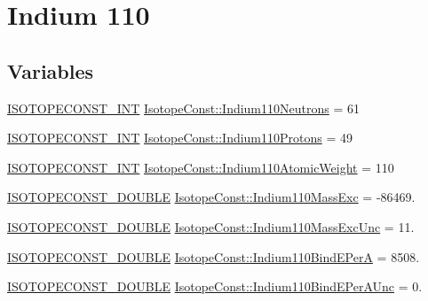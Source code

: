 \hypertarget{group___isotope_const-_indium-_in110}{}\section{Indium 110}
\label{group___isotope_const-_indium-_in110}
\subsection*{Variables}
\begin{DoxyCompactItemize}
\item 
\mbox{\hyperlink{group___isotope_const-_macros_ga5f18360b3e99483a35c32d789e62621c}{I\+S\+O\+T\+O\+P\+E\+C\+O\+N\+S\+T\+\_\+\+I\+NT}} \mbox{\hyperlink{group___isotope_const-_indium-_in110_gab02e4994dcbec53f0df51ac422ecd6f7}{Isotope\+Const\+::\+Indium110\+Neutrons}} = 61
\item 
\mbox{\hyperlink{group___isotope_const-_macros_ga5f18360b3e99483a35c32d789e62621c}{I\+S\+O\+T\+O\+P\+E\+C\+O\+N\+S\+T\+\_\+\+I\+NT}} \mbox{\hyperlink{group___isotope_const-_indium-_in110_ga3eb5f874d2904cc25ff4b0c7fe9475ab}{Isotope\+Const\+::\+Indium110\+Protons}} = 49
\item 
\mbox{\hyperlink{group___isotope_const-_macros_ga5f18360b3e99483a35c32d789e62621c}{I\+S\+O\+T\+O\+P\+E\+C\+O\+N\+S\+T\+\_\+\+I\+NT}} \mbox{\hyperlink{group___isotope_const-_indium-_in110_gabcf9bf4e6c944aa9c7cfcc2087b8ff17}{Isotope\+Const\+::\+Indium110\+Atomic\+Weight}} = 110
\item 
\mbox{\hyperlink{group___isotope_const-_macros_ga8f45a7272ce02c0b4c65c44636ed719a}{I\+S\+O\+T\+O\+P\+E\+C\+O\+N\+S\+T\+\_\+\+D\+O\+U\+B\+LE}} \mbox{\hyperlink{group___isotope_const-_indium-_in110_gafb3084ef3de1ffc30f1478830eda8339}{Isotope\+Const\+::\+Indium110\+Mass\+Exc}} = -\/86469.
\item 
\mbox{\hyperlink{group___isotope_const-_macros_ga8f45a7272ce02c0b4c65c44636ed719a}{I\+S\+O\+T\+O\+P\+E\+C\+O\+N\+S\+T\+\_\+\+D\+O\+U\+B\+LE}} \mbox{\hyperlink{group___isotope_const-_indium-_in110_ga13f943dd42b8c1345153fc0c58b29a2c}{Isotope\+Const\+::\+Indium110\+Mass\+Exc\+Unc}} = 11.
\item 
\mbox{\hyperlink{group___isotope_const-_macros_ga8f45a7272ce02c0b4c65c44636ed719a}{I\+S\+O\+T\+O\+P\+E\+C\+O\+N\+S\+T\+\_\+\+D\+O\+U\+B\+LE}} \mbox{\hyperlink{group___isotope_const-_indium-_in110_gaad3d37debd4572a3138aab8de75f6091}{Isotope\+Const\+::\+Indium110\+Bind\+E\+PerA}} = 8508.
\item 
\mbox{\hyperlink{group___isotope_const-_macros_ga8f45a7272ce02c0b4c65c44636ed719a}{I\+S\+O\+T\+O\+P\+E\+C\+O\+N\+S\+T\+\_\+\+D\+O\+U\+B\+LE}} \mbox{\hyperlink{group___isotope_const-_indium-_in110_ga646fa556bfedbd7e9172bb55d90fdb8a}{Isotope\+Const\+::\+Indium110\+Bind\+E\+Per\+A\+Unc}} = 0.

\end{DoxyCompactItemize}
